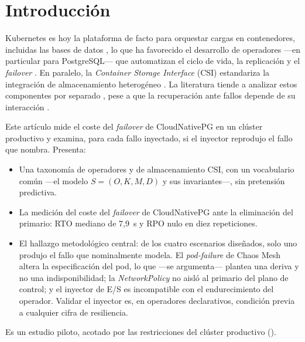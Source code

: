 
\section{Introducción}\label{sec:intro}
Kubernetes es hoy la plataforma de facto para orquestar cargas en contenedores, incluidas las bases de datos \citep{schwarzkopf2013,burns2016}, lo que ha favorecido el desarrollo de operadores —en particular para PostgreSQL— que automatizan el ciclo de vida, la replicación y el \textit{failover} \citep{dobies2020,k8s2026operator}. En paralelo, la \textit{Container Storage Interface} (CSI) estandariza la integración de almacenamiento heterogéneo \citep{k8s2024csi}. La literatura tiende a analizar estos componentes por separado \citep{gilbert2002,bailis2013}, pese a que la recuperación ante fallos depende de su interacción \citep{avizienis2004}.

Este artículo mide el coste del \textit{failover} de CloudNativePG en un clúster productivo y examina, para cada fallo inyectado, si el inyector reprodujo el fallo que nombra. Presenta:
\begin{itemize}[leftmargin=1.2em,itemsep=2pt,topsep=2pt]
\item Una taxonomía de operadores y de almacenamiento CSI, con un vocabulario común —el modelo $S=(O,K,M,D)$ y sus invariantes—, sin pretensión predictiva.
\item La medición del coste del \textit{failover} de CloudNativePG ante la eliminación del primario: RTO mediano de 7,9~s y RPO nulo en diez repeticiones.
\item El hallazgo metodológico central: de los cuatro escenarios diseñados, solo uno produjo el fallo que nominalmente modela. El \textit{pod-failure} de Chaos Mesh altera la especificación del pod, lo que —se argumenta— plantea una deriva y no una indisponibilidad; la \textit{NetworkPolicy} no aisló al primario del plano de control; y el inyector de E/S es incompatible con el endurecimiento del operador. Validar el inyector es, en operadores declarativos, condición previa a cualquier cifra de resiliencia.
\end{itemize}
Es un estudio piloto, acotado por las restricciones del clúster productivo ().

